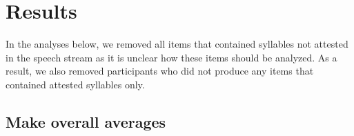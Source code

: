 \documentclass[]{article}
\begin{document}
\section{Results}\label{results}

In the analyses below, we removed all items that contained syllables not
attested in the speech stream as it is unclear how these items should be
analyzed. As a result, we also removed participants who did not produce
any items that contained attested syllables only.

\subsection{Make overall averages}\label{make-overall-averages}

\begin{table}[!h]


\end{table}
\end{document}
